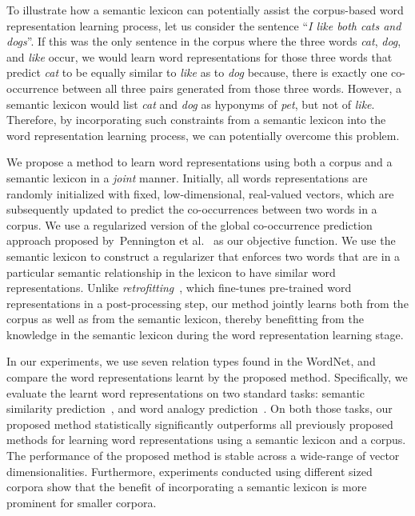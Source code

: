 \documentclass[letterpaper]{article}
\begin{document}
To illustrate how a semantic lexicon can potentially assist the corpus-based word representation learning process,
let us consider the sentence ``\emph{I like both cats and dogs}''.
If this was the only sentence in the corpus where the three words \emph{cat}, \emph{dog}, and \emph{like} occur,
we would learn word representations for those three words
that predict \emph{cat} to be equally similar to \emph{like} as to \emph{dog} because,
there is exactly one co-occurrence between all three pairs generated from those three words.
However, a semantic lexicon would list \emph{cat} and \emph{dog} as hyponyms of \emph{pet}, but not of \emph{like}.
Therefore, by incorporating such constraints from a semantic lexicon
into the word representation learning process, we can potentially overcome this problem.

We propose a method to learn word representations using both a corpus and a semantic lexicon in a \emph{joint} manner.
Initially, all words representations are randomly initialized with fixed, low-dimensional, real-valued vectors, which are subsequently updated to
predict the co-occurrences between two words in a corpus.
We use a regularized version of the global co-occurrence prediction approach proposed
by~Pennington et al.~ as our objective function.
We use the semantic lexicon to construct a regularizer that enforces two words that are in a particular semantic relationship in the lexicon
to have similar word representations.
Unlike \emph{retrofitting}~\cite{faruqui-EtAl:2015:NAACL-HLT},
which fine-tunes pre-trained word representations in a post-processing step, our method
jointly learns both from the corpus as well as from the semantic lexicon, thereby benefitting from the knowledge in the
semantic lexicon during the word representation learning stage.

In our experiments, we use seven relation types found in the WordNet, and compare the word representations
learnt by the proposed method.
Specifically, we evaluate the learnt word representations on two standard tasks:
semantic similarity prediction~\cite{Bollegala:NAACL:2007}, and word analogy prediction~\cite{Duc:AAAI:2011}.
On both those tasks, our proposed method statistically significantly outperforms all
previously proposed methods for learning word representations using a semantic lexicon and a corpus.
The performance of the proposed method is stable across a wide-range of vector dimensionalities.
Furthermore, experiments conducted using different sized corpora show that the benefit of incorporating a semantic lexicon
is more prominent for smaller corpora.
\end{document}
